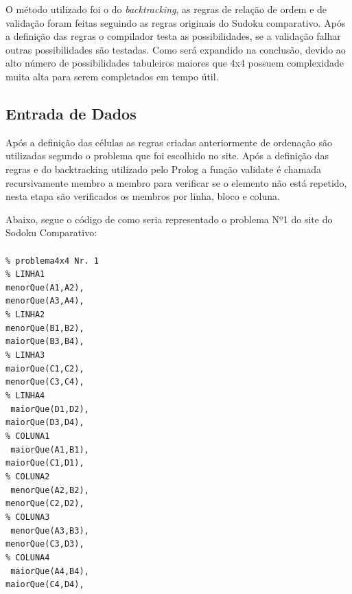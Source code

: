 \documentclass{article}
\begin{document}
O método utilizado foi o do \textit{backtracking}, as regras de relação de ordem e de validação foram feitas seguindo as regras originais do Sudoku comparativo. Após a definição das regras o compilador testa as possibilidades, se a validação falhar outras possibilidades são testadas. Como será expandido na conclusão, devido ao alto número de possibilidades tabuleiros maiores que 4x4 possuem complexidade muita alta para serem completados em tempo útil.

\subsection{Entrada de Dados}

Após a definição das células as regras criadas anteriormente de ordenação são utilizadas segundo o problema que foi escolhido no site. Após a definição das regras e do backtracking utilizado pelo Prolog a função validate é chamada recursivamente membro a membro para verificar se o elemento não está repetido, nesta etapa são verificados os membros por linha, bloco e coluna.

Abaixo, segue o código de como seria representado o problema Nº1 do site do Sodoku Comparativo:
\\
\\
\texttt{\% problema4x4 Nr. 1\\
    \% LINHA1\\
    menorQue(A1,A2),\\
    menorQue(A3,A4),\\
    \% LINHA2\\
    menorQue(B1,B2),\\
    maiorQue(B3,B4),\\
    \% LINHA3\\
    maiorQue(C1,C2),\\
    menorQue(C3,C4),\\
    \% LINHA4\\\
    maiorQue(D1,D2),\\
    maiorQue(D3,D4),\\
    \% COLUNA1\\\
    maiorQue(A1,B1),\\
    maiorQue(C1,D1),\\
    \% COLUNA2\\\
    menorQue(A2,B2),\\
    menorQue(C2,D2),\\
    \% COLUNA3\\\
    menorQue(A3,B3),\\
    menorQue(C3,D3),\\
    \% COLUNA4\\\
    maiorQue(A4,B4),\\
    maiorQue(C4,D4),\\
}
\end{document}
